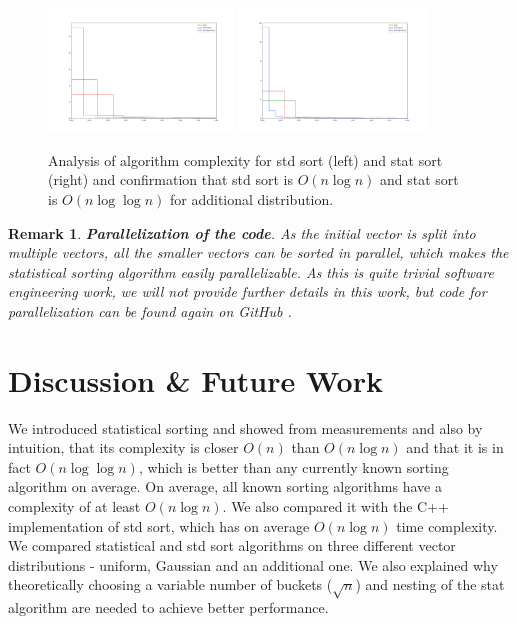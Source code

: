 \documentclass[12pt]{article}
\newtheorem*{remark}{Remark}
\begin{document}
                \begin{figure}
		\begin{center}
			\includegraphics[width=0.44\textwidth]{fig_dist_anal_weird_stdsort.png}
			\includegraphics[width=0.44\textwidth]{fig_dist_anal_weird_statsort.png}
		\end{center}
		\caption{Analysis of algorithm complexity for std sort (left) and stat sort (right) and confirmation that std sort is $O(n \log n)$ and stat sort is $O(n \log \log n)$ for additional distribution.}
		\label{fig7}
		\end{figure}	
        
        
    \begin{remark}
	
	\textbf{Parallelization of the code}. As the initial vector is split into multiple vectors, all the smaller vectors can be sorted in parallel, which makes the statistical sorting algorithm easily parallelizable. As this is quite trivial software engineering work, we will not provide further details in this work, but code for parallelization can be found again on GitHub \cite{peta78b}.
    \end{remark}

	\section{Discussion \& Future Work}
	
	We introduced statistical sorting and showed from measurements and also by intuition, that its complexity is closer $O(n)$ than $O(n \log n)$ and that it is in fact $O(n \log \log n)$, which is better than any currently known sorting algorithm on average. On average, all known sorting algorithms have a complexity of at least $O(n \log n)$. We also compared it with the C++ implementation of std sort, which has on average $O(n \log n)$ time complexity. We compared statistical and std sort algorithms on three different vector distributions - uniform, Gaussian and an additional one. We also explained why theoretically choosing a variable number of buckets ($\sqrt{n}$) and nesting of the stat algorithm are needed to achieve better performance.
	
\end{document}
